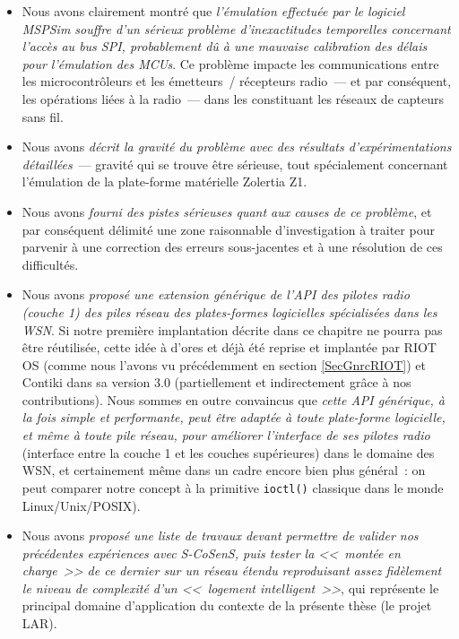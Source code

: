\begin{itemize}

\item Nous avons clairement montré que \emph{l'émulation effectuée par le
logiciel MSPSim souffre d'un sérieux problème d'inexactitudes temporelles
concernant l'accès au bus SPI, probablement dû à une mauvaise calibration
des délais pour l'émulation des MCUs}. Ce problème impacte les
communications entre les microcontrôleurs et les émetteurs~/ récepteurs
radio~--- et par conséquent, les opérations liées à la radio~--- dans les
 constituant les réseaux de capteurs sans fil.

\item Nous avons \emph{décrit la gravité du problème avec des résultats
d'expérimentations détaillées}~--- gravité qui se trouve être sérieuse,
tout spécialement concernant l'émulation de la plate-forme matérielle
Zolertia Z1.

\item Nous avons \emph{fourni des pistes sérieuses quant aux causes de ce
problème}, et par conséquent délimité une zone raisonnable d'investigation
à traiter pour parvenir à une correction des erreurs sous-jacentes et
à une résolution de ces difficultés.

\item Nous avons \emph{proposé une extension générique de l'API des pilotes
radio (couche 1) des piles réseau des plates-formes logicielles spécialisées
dans les WSN}. Si notre première implantation décrite dans ce chapitre
ne pourra pas être réutilisée, cette idée à d'ores et déjà été reprise
et implantée par RIOT OS (comme nous l'avons vu précédemment en section
\vref{SecGnrcRIOT}) et Contiki dans sa version 3.0 (partiellement et
indirectement grâce à nos contributions). Nous sommes en outre convaincus
que \emph{cette API générique, à la fois simple et performante, peut être
adaptée à toute plate-forme logicielle, et même à toute pile réseau, pour
améliorer l'interface de ses pilotes radio} (interface entre la couche 1
et les couches supérieures) dans le domaine des WSN, et certainement
même dans un cadre encore bien plus général~: on peut comparer notre
concept à la primitive \texttt{ioctl()} classique dans le monde
Linux/Unix/POSIX).

\item Nous avons \emph{proposé une liste de travaux devant permettre de
valider nos précédentes expériences avec S-CoSenS, puis tester la <<~montée
en charge~>> de ce dernier sur un réseau étendu reproduisant assez
fidèlement le niveau de complexité d'un <<~logement intelligent~>>},
qui représente le principal domaine d'application du contexte de la présente
thèse (le projet LAR).


\end{itemize}
